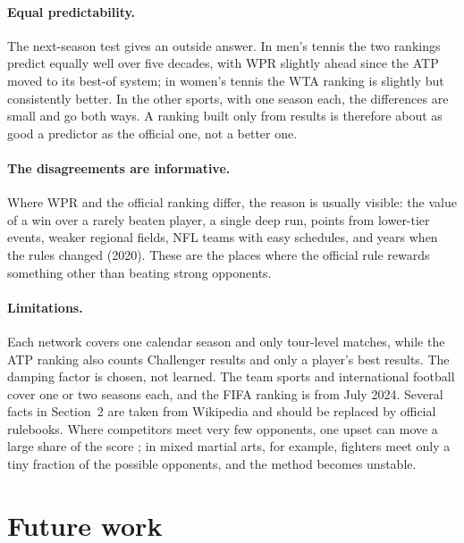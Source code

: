 \documentclass[11pt]{article}
\begin{document}
\paragraph{Equal predictability.} The next-season test gives an outside answer. In men's tennis the two rankings predict equally well over five decades, with WPR slightly ahead since the ATP moved to its best-of system; in women's tennis the WTA ranking is slightly but consistently better. In the other sports, with one season each, the differences are small and go both ways. A ranking built only from results is therefore about as good a predictor as the official one, not a better one.

\paragraph{The disagreements are informative.} Where WPR and the official ranking differ, the reason is usually visible: the value of a win over a rarely beaten player, a single deep run, points from lower-tier events, weaker regional fields, NFL teams with easy schedules, and years when the rules changed (2020). These are the places where the official rule rewards something other than beating strong opponents.

\paragraph{Limitations.} Each network covers one calendar season and only tour-level matches, while the ATP ranking also counts Challenger results and only a player's best results. The damping factor is chosen, not learned. The team sports and international football cover one or two seasons each, and the FIFA ranking is from July 2024. Several facts in Section~2 are taken from Wikipedia and should be replaced by official rulebooks. Where competitors meet very few opponents, one upset can move a large share of the score \citep{zhou2020}; in mixed martial arts, for example, fighters meet only a tiny fraction of the possible opponents, and the method becomes unstable.

\section{Future work}
\end{document}
